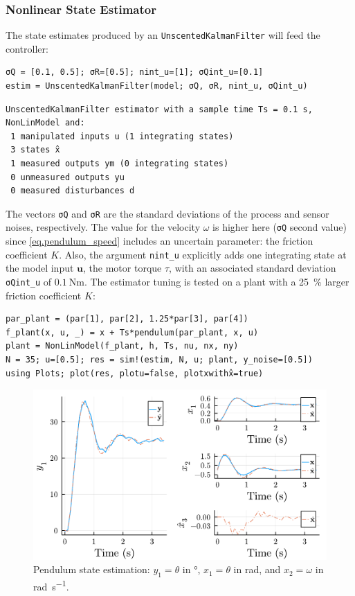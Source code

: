 \subsubsection{Nonlinear State Estimator}

The state estimates produced by an \texttt{UnscentedKalmanFilter} will feed the controller:

\begin{verbatim}
σQ = [0.1, 0.5]; σR=[0.5]; nint_u=[1]; σQint_u=[0.1]
estim = UnscentedKalmanFilter(model; σQ, σR, nint_u, σQint_u)
\end{verbatim}
\spacerepl
\begin{verbatim}
UnscentedKalmanFilter estimator with a sample time Ts = 0.1 s, 
NonLinModel and:
 1 manipulated inputs u (1 integrating states)
 3 states x̂
 1 measured outputs ym (0 integrating states)
 0 unmeasured outputs yu
 0 measured disturbances d
\end{verbatim}
The vectors \texttt{σQ} and \texttt{σR} are the standard deviations of the process and sensor noises, respectively. The value for the velocity $\omega$ is higher here (\texttt{σQ} second value) since \eqref{eq.pendulum_speed} includes an uncertain parameter: the friction coefficient $K$. Also, the argument \texttt{nint\_u} explicitly adds one integrating state at the model input $\mathbf{u}$, the motor torque $\tau$, with an associated standard deviation \texttt{σQint\_u} of $\SI{0.1}{\newton\meter}$. The estimator tuning is tested on a plant with a \SI{25}{\percent} larger friction coefficient $K$:
\begin{verbatim}
par_plant = (par[1], par[2], 1.25*par[3], par[4])
f_plant(x, u, _) = x + Ts*pendulum(par_plant, x, u)
plant = NonLinModel(f_plant, h, Ts, nu, nx, ny)
N = 35; u=[0.5]; res = sim!(estim, N, u; plant, y_noise=[0.5])
using Plots; plot(res, plotu=false, plotxwithx̂=true)
\end{verbatim}

\begin{figure}[h]
    \centering
    \includegraphics[width=\columnwidth]{fig/plot_NonLinMPC1.pdf}
    \caption{Pendulum state estimation: $y_1 = \theta$ in \si{\degree}, $x_1=\theta$ in \si{\radian}, and $x_2=\omega$ in \si{\radian\per\second}.}
    \label{fig:plot_NonLinMPC1}
\end{figure}

